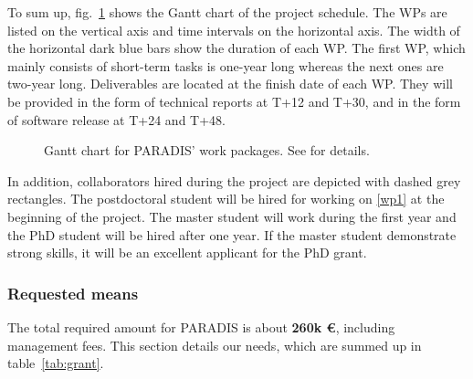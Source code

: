To sum up, fig.~\ref{fig:gantt} shows the Gantt chart of the project schedule.
The WPs are listed on the vertical axis and time intervals on the horizontal axis.
The width of the horizontal dark blue bars show the duration of each WP. The first WP,
which mainly consists of short-term tasks is one-year long whereas the next ones are
two-year long. Deliverables are located at the finish date of each WP. They will be
provided in the form of technical reports at T+12 and T+30, and in the form of software
release at T+24 and T+48.

\begin{figure}[htbp]
  \centering
  
  \caption{Gantt chart for PARADIS' work packages. See  for details.}
  \label{fig:gantt}
\end{figure}

In addition, collaborators hired during the project are depicted with dashed grey rectangles.
The postdoctoral student will be hired for working on \ref{wp1} at the beginning of the project.
The master student will work during the first year and the PhD student will be hired
after one year. If the master student demonstrate strong skills, it will be an excellent applicant
for the PhD grant.

\subsubsection{Requested means}
\label{sec:ressources}



The total required amount for PARADIS is about \textbf{260k \euro}, including management fees.
This section details our needs, which are summed up in table~\ref{tab:grant}.

